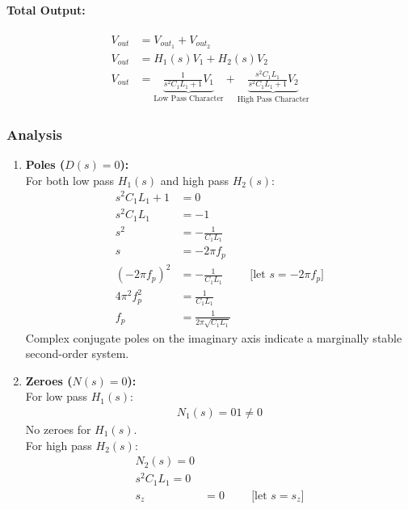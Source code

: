 \paragraph{Total Output:}
\begin{align*}
  V_{out} &= V_{out_1} + V_{out_2} \\
  V_{out} &= H_1(s)V_{1} + H_2(s)V_{2} \\
  V_{out} &= \underbrace{\frac{1}{s^2C_1L_1 + 1}V_{1}}_{\text{Low Pass Character}} + \underbrace{\frac{s^2C_1L_1}{s^2C_1L_1 + 1}V_{2}}_{\text{High Pass Character}}
\end{align*}

\subsubsection{Analysis}
\begin{enumerate}
  \item \textbf{Poles (\(D(s) = 0\)):} \\
    For both low pass \(H_1(s)\) and high pass \(H_2(s)\):
    \begin{align*}
      s^2C_1L_1 + 1 &= 0 \\
      s^2C_1L_1 &= -1 \\
      s^2 &= -\frac{1}{C_1L_1} \\
      s &= -2 \pi f_p \\
      (-2 \pi f_p)^2 &= -\frac{1}{C_1L_1} \hspace{1cm} \text{[let \(s = -2 \pi f_p\)]} \\
      4 \pi^2 f_p^2 &= \frac{1}{C_1L_1} \\
      f_p &= \frac{1}{2 \pi \sqrt{C_1L_1}}
    \end{align*}
    Complex conjugate poles on the imaginary axis indicate
    a marginally stable second-order system.
  \item \textbf{Zeroes (\(N(s) = 0\)):} \\
    For low pass \(H_1(s)\):
    \begin{align*}
        N_1(s) = 0
        1 \neq 0
    \end{align*}
    No zeroes for \(H_1(s)\). \\
    For high pass \(H_2(s)\):
    \begin{align*}
        N_2(s) = 0 \\
        s^2C_1L_1 = 0 \\
        s_z &= 0 \hspace{1cm} \text{[let \(s = s_z\)]} \\

\end{align*}
\end{enumerate}
